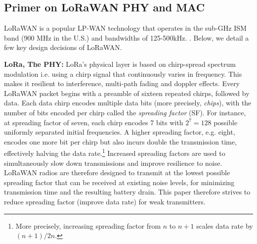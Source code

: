 \subsection{Primer on LoRaWAN PHY and MAC}
\label{sec:lora}

LoRaWAN is a popular LP-WAN technology that operates in the sub-GHz ISM band
(900 MHz in the U.S.) and bandwidths of 125-500kHz. 
. 
Below, we detail a few key design decisions of LoRaWAN.

\noindent \textbf{LoRa, The PHY: } LoRa's physical layer is based on
chirp-spread spectrum modulation i.e. using a chirp signal that continuously
varies in frequency. This makes it resilient to interference, multi-path
fading and doppler effects. Every LoRaWAN packet begins with a preamble of
sixteen repeated chirps, followed by data. Each data chirp encodes multiple
data bits (more precisely, \textit{chips}), with the number of  bits encoded
per chirp called the \textit{spreading factor} (SF). For instance, at
spreading factor of seven, each chirp encodes 7 bits with $2^7 = 128$ possible
uniformly separated initial frequencies. A higher spreading factor, e.g.
eight, encodes one more bit per chirp but also incurs double the transmission
time, effectively halving the data rate.\footnote{More precisely, increasing
spreading factor from $n$ to $n+1$ scales data rate by $(n+1)/2n$.} Increased
spreading factors are used to simultaneously slow down transmissions and
improve resilience to noise. LoRaWAN radios are therefore designed to transmit
at the lowest possible spreading factor that can be received at existing noise
levels, for minimizing transmission time and the resulting battery drain. This
paper therefore strives to reduce spreading factor (improve data rate) for
weak transmitters.



